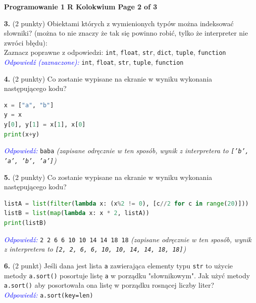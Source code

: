 \documentclass[a4paper,12pt]{article}
\begin{document}
\newpage
\begin{center}
    \textbf{\Large Programowanie 1 R \hfill Kolokwium \hfill Page 2 of 3}
\end{center}

\vspace{0.5cm}

\noindent \textbf{3.} (2 punkty) Obiektami których z wymienionych typów można indeksować słowniki? (można to nie znaczy że tak się powinno robić, tylko że interpreter nie zwróci błędu): \\
Zaznacz poprawne z odpowiedzi: \texttt{int}, \texttt{float}, \texttt{str}, \texttt{dict}, \texttt{tuple}, \texttt{function} \\
\textcolor{blue}{\textit{Odpowiedź (zaznaczone):}} \texttt{int}, \texttt{float}, \texttt{str}, \texttt{tuple}, \texttt{function}

\vspace{0.5cm}

\noindent \textbf{4.} (2 punkty) Co zostanie wypisane na ekranie w wyniku wykonania następującego kodu?
\begin{lstlisting}[language=Python]
x = ["a", "b"]
y = x
y[0], y[1] = x[1], x[0]
print(x+y)
\end{lstlisting}
\textcolor{blue}{\textit{Odpowiedź:}} \texttt{baba} \textit{(zapisane odręcznie w ten sposób, wynik z interpretera to \texttt{['b', 'a', 'b', 'a']})}

\vspace{0.5cm}

\noindent \textbf{5.} (2 punkty) Co zostanie wypisane na ekranie w wyniku wykonania następującego kodu?
\begin{lstlisting}[language=Python]
listA = list(filter(lambda x: (x%2 != 0), [c//2 for c in range(20)]))
listB = list(map(lambda x: x * 2, listA))
print(listB)
\end{lstlisting}
\textcolor{blue}{\textit{Odpowiedź:}} \texttt{2 2 6 6 10 10 14 14 18 18} \textit{(zapisane odręcznie w ten sposób, wynik z interpretera to \texttt{[2, 2, 6, 6, 10, 10, 14, 14, 18, 18]})}

\vspace{0.5cm}

\noindent \textbf{6.} (2 punkt) Jeśli dana jest lista \texttt{a} zawierająca elementy typu \texttt{str} to użycie metody \texttt{a.sort()} posortuje listę \texttt{a} w porządku "słownikowym". Jak użyć metody \texttt{a.sort()} aby posortowała ona listę w porządku rosnącej liczby liter? \\
\textcolor{blue}{\textit{Odpowiedź:}} \texttt{a.sort(key=len)}
\end{document}
